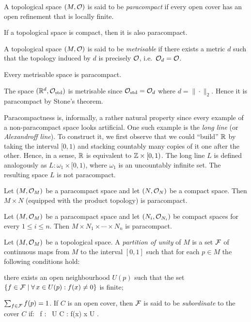 \bd
A topological space $(M,\mathcal{O})$ is said to be \emph{paracompact} if every open cover has an open refinement that is locally finite.
\ed

\bc
If a topological space is compact, then it is also paracompact.
\ec

\bd
A topological space $(M,\mathcal{O})$ is said to be \emph{metrisable} if there exists a metric $d$ such that the topology induced by $d$ is precisely $\mathcal{O}$, i.e.\ $\mathcal{O}_d=\mathcal{O}$. 
\ed

\bt[Stone]
Every metrisable space is paracompact.
\et

\be
The space $(\mathbb{R}^d,\mathcal{O}_\mathrm{std})$ is metrisable since $\mathcal{O}_\mathrm{std}=\mathcal{O}_d$ where $d = \|\cdot\|_2$. Hence it is paracompact by Stone's theorem.
\ee

\br
Paracompactness is, informally, a rather natural property since every example of a non-paracompact space looks artificial. One such example is the \emph{long line} (or \emph{Alexandroff line}). To construct it, we first observe that we could ``build'' $\mathbb{R}$ by taking the interval $[0,1)$ and stacking countably many copies of it one after the other. Hence, in a sense, $\mathbb{R}$ is equivalent to $\mathbb{Z} \times [0,1)$. The long line $L$ is defined analogously as $L:\omega_1\times [0,1)$, where $\omega_1$ is an uncountably infinite set. The resulting space $L$ is not paracompact.
\er

\bt
Let $(M,\mathcal{O}_M)$ be a paracompact space and let $(N,\mathcal{O}_N)$ be a compact space. Then $M\times N$ (equipped with the product topology) is paracompact.
\et

\bc
Let $(M,\mathcal{O}_M)$ be a paracompact space and let $(N_i,\mathcal{O}_{N_i})$ be compact spaces for every $1\leq i \leq n$. Then $M\times N_1\times\cdots\times N_n$ is paracompact.
\ec

\bd
Let $(M,\mathcal{O}_M)$ be a topological space. A \emph{partition of unity}  of $M$ is a set $\mathcal{F}$ of continuous maps from $M$ to the interval $[0,1]$ such that for each $p\in M$ the following conditions hold:
\ben
\item[i)] there exists an open neighbourhood $U(p)$ such that the set $\{f \in \mathcal{F} \mid \forall \, x \in U(p):f(x)\neq 0\}$ is finite;
\item[ii)] $\sum_{f\in \mathcal{F}}f(p)=1$.
\een
If $C$ is an open cover, then $\mathcal{F}$ is said to be \emph{subordinate} to the cover $C$ if:
\bse
\forall \, f \in \cF : \exists \, U \in C : f(x)  \imp x \in U .
\ese
\ed

